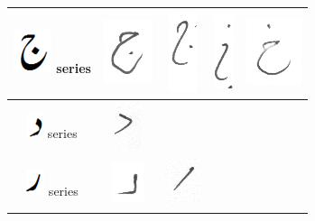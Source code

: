 \begin{table}[h]
\begin{tabular}{@{}ccccc@{}}
\includegraphics[scale=0.25]{jeeem} series & \includegraphics[scale=0.20]{46} & \includegraphics[scale=0.15]{47}  & \includegraphics[scale=0.15]{48} &
\includegraphics[scale=0.15]{49} \\
\hline
\includegraphics[scale=0.25]{daal_orig} series & \includegraphics[scale=0.15]{50} & & &  \\
\hline
\includegraphics[scale=0.25]{re_orig} series & \includegraphics[scale=0.15]{51} & \includegraphics[scale=0.15]{52}  & & \\

\end{tabular}
\end{table}
